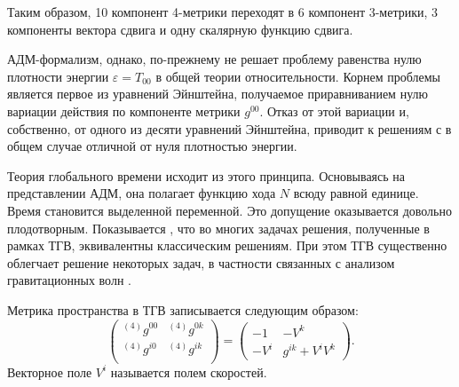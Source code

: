 \documentclass[\docroot/reports/draft/report.tex]{subfiles}
\begin{document}
    Таким образом, 10 компонент 4-метрики переходят в 6 компонент 3-метрики, 3 компоненты вектора сдвига и одну скалярную функцию сдвига.

    АДМ-формализм, однако, по-прежнему не решает проблему равенства нулю плотности энергии $\varepsilon = T_{00}$ в общей теории относительности. Корнем проблемы является первое из уравнений Эйнштейна, получаемое приравниванием нулю вариации действия по компоненте метрики $g^{00}$. Отказ от этой вариации и, собственно, от одного из десяти уравнений Эйнштейна, приводит к решениям с в общем случае отличной от нуля плотностью энергии.

    Теория глобального времени исходит из этого принципа. Основываясь на представлении АДМ, она полагает функцию хода $N$ всюду равной единице. Время становится выделенной переменной. Это допущение оказывается довольно плодотворным. Показывается \cite{burlankov_space_dynamics,burlankov_grav_waves}, что во многих задачах решения, полученные в рамках ТГВ, эквивалентны классическим решениям. При этом ТГВ существенно облегчает решение некоторых задач, в частности связанных с анализом гравитационных волн \cite{burlankov_grav_waves}.

    Метрика пространства в ТГВ записывается следующим образом:
    \begin{equation*}
        \begin{pmatrix}
            {}^{(4)}g^{00} & {}^{(4)}g^{0k} \\
            {}^{(4)}g^{i0} & {}^{(4)}g^{ik} \\
        \end{pmatrix} =
        \begin{pmatrix}
            - 1   & - V^k \\
            - V^i & g^{ik} + V^i V^k
        \end{pmatrix} .
    \end{equation*}
    Векторное поле $V^i$ называется полем скоростей.

\end{document}
